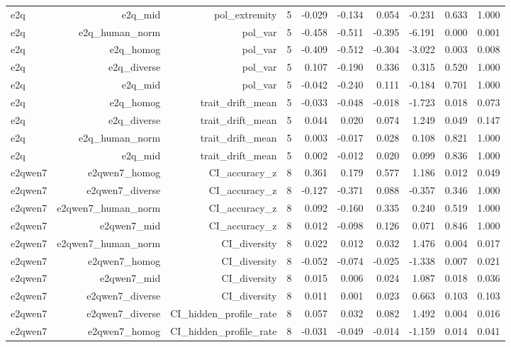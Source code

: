 \documentclass[11pt]{article}
\begin{document}
\begin{landscape}
\begin{longtable}{@{}lrrrrrrrrr@{}}
e2q & e2q\_mid & pol\_extremity & 5 & -0.029 & -0.134 & 0.054 & -0.231 & 0.633 & 1.000 \\
e2q & e2q\_human\_norm & pol\_var & 5 & -0.458 & -0.511 & -0.395 & -6.191 & 0.000 & 0.001 \\
e2q & e2q\_homog & pol\_var & 5 & -0.409 & -0.512 & -0.304 & -3.022 & 0.003 & 0.008 \\
e2q & e2q\_diverse & pol\_var & 5 & 0.107 & -0.190 & 0.336 & 0.315 & 0.520 & 1.000 \\
e2q & e2q\_mid & pol\_var & 5 & -0.042 & -0.240 & 0.111 & -0.184 & 0.701 & 1.000 \\
e2q & e2q\_homog & trait\_drift\_mean & 5 & -0.033 & -0.048 & -0.018 & -1.723 & 0.018 & 0.073 \\
e2q & e2q\_diverse & trait\_drift\_mean & 5 & 0.044 & 0.020 & 0.074 & 1.249 & 0.049 & 0.147 \\
e2q & e2q\_human\_norm & trait\_drift\_mean & 5 & 0.003 & -0.017 & 0.028 & 0.108 & 0.821 & 1.000 \\
e2q & e2q\_mid & trait\_drift\_mean & 5 & 0.002 & -0.012 & 0.020 & 0.099 & 0.836 & 1.000 \\
e2qwen7 & e2qwen7\_homog & CI\_accuracy\_z & 8 & 0.361 & 0.179 & 0.577 & 1.186 & 0.012 & 0.049 \\
e2qwen7 & e2qwen7\_diverse & CI\_accuracy\_z & 8 & -0.127 & -0.371 & 0.088 & -0.357 & 0.346 & 1.000 \\
e2qwen7 & e2qwen7\_human\_norm & CI\_accuracy\_z & 8 & 0.092 & -0.160 & 0.335 & 0.240 & 0.519 & 1.000 \\
e2qwen7 & e2qwen7\_mid & CI\_accuracy\_z & 8 & 0.012 & -0.098 & 0.126 & 0.071 & 0.846 & 1.000 \\
e2qwen7 & e2qwen7\_human\_norm & CI\_diversity & 8 & 0.022 & 0.012 & 0.032 & 1.476 & 0.004 & 0.017 \\
e2qwen7 & e2qwen7\_homog & CI\_diversity & 8 & -0.052 & -0.074 & -0.025 & -1.338 & 0.007 & 0.021 \\
e2qwen7 & e2qwen7\_mid & CI\_diversity & 8 & 0.015 & 0.006 & 0.024 & 1.087 & 0.018 & 0.036 \\
e2qwen7 & e2qwen7\_diverse & CI\_diversity & 8 & 0.011 & 0.001 & 0.023 & 0.663 & 0.103 & 0.103 \\
e2qwen7 & e2qwen7\_diverse & CI\_hidden\_profile\_rate & 8 & 0.057 & 0.032 & 0.082 & 1.492 & 0.004 & 0.016 \\
e2qwen7 & e2qwen7\_homog & CI\_hidden\_profile\_rate & 8 & -0.031 & -0.049 & -0.014 & -1.159 & 0.014 & 0.041 \\

\end{longtable}
\end{landscape}
\end{document}
